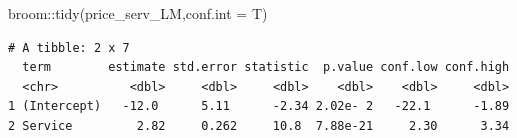 \documentclass[
  letterpaper,
  DIV=11,
  numbers=noendperiod]{scrartcl}
\newenvironment{Shaded}{\begin{snugshade}}{\end{snugshade}}
\newcommand{\AttributeTok}[1]{\textcolor[rgb]{0.40,0.45,0.13}{#1}}
\newcommand{\FunctionTok}[1]{\textcolor[rgb]{0.28,0.35,0.67}{#1}}
\newcommand{\NormalTok}[1]{\textcolor[rgb]{0.00,0.23,0.31}{#1}}
\newcommand{\SpecialCharTok}[1]{\textcolor[rgb]{0.37,0.37,0.37}{#1}}
\begin{document}
\begin{tcolorbox}
\begin{Shaded}
\begin{Highlighting}[]
\NormalTok{broom}\SpecialCharTok{::}\FunctionTok{tidy}\NormalTok{(price\_serv\_LM,}\AttributeTok{conf.int =}\NormalTok{ T)}
\end{Highlighting}
\end{Shaded}

\begin{verbatim}
# A tibble: 2 x 7
  term        estimate std.error statistic  p.value conf.low conf.high
  <chr>          <dbl>     <dbl>     <dbl>    <dbl>    <dbl>     <dbl>
1 (Intercept)   -12.0      5.11      -2.34 2.02e- 2   -22.1      -1.89
2 Service         2.82     0.262     10.8  7.88e-21     2.30      3.34
\end{verbatim}

\end{tcolorbox}
\end{document}
